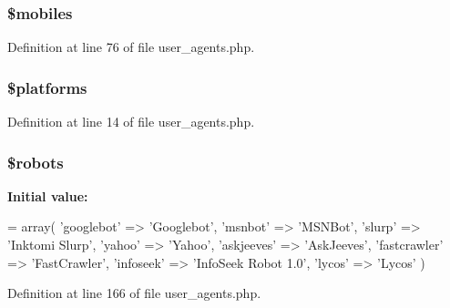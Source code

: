 \subsubsection[{\texorpdfstring{\$mobiles}{$mobiles}}]{\setlength{\rightskip}{0pt plus 5cm}\$mobiles}\hypertarget{user__agents_8php_a6928dde5aa0be443766d5b2376de908a}{}\label{user__agents_8php_a6928dde5aa0be443766d5b2376de908a}


Definition at line 76 of file user\+\_\+agents.\+php.

\subsubsection[{\texorpdfstring{\$platforms}{$platforms}}]{\setlength{\rightskip}{0pt plus 5cm}\$platforms}\hypertarget{user__agents_8php_a1c1a0a860242698ee6b3f4ef7d6eb343}{}\label{user__agents_8php_a1c1a0a860242698ee6b3f4ef7d6eb343}


Definition at line 14 of file user\+\_\+agents.\+php.

\subsubsection[{\texorpdfstring{\$robots}{$robots}}]{\setlength{\rightskip}{0pt plus 5cm}\$robots}\hypertarget{user__agents_8php_a5752e2a66d1c03bc34666492746037ab}{}\label{user__agents_8php_a5752e2a66d1c03bc34666492746037ab}
{\bfseries Initial value\+:}
\begin{DoxyCode}
= array(
    \textcolor{stringliteral}{'googlebot'} => \textcolor{stringliteral}{'Googlebot'},
    \textcolor{stringliteral}{'msnbot'} => \textcolor{stringliteral}{'MSNBot'},
    \textcolor{stringliteral}{'slurp'} => \textcolor{stringliteral}{'Inktomi Slurp'},
    \textcolor{stringliteral}{'yahoo'} => \textcolor{stringliteral}{'Yahoo'},
    \textcolor{stringliteral}{'askjeeves'} => \textcolor{stringliteral}{'AskJeeves'},
    \textcolor{stringliteral}{'fastcrawler'} => \textcolor{stringliteral}{'FastCrawler'},
    \textcolor{stringliteral}{'infoseek'} => \textcolor{stringliteral}{'InfoSeek Robot 1.0'},
    \textcolor{stringliteral}{'lycos'} => \textcolor{stringliteral}{'Lycos'}
)
\end{DoxyCode}


Definition at line 166 of file user\+\_\+agents.\+php.

